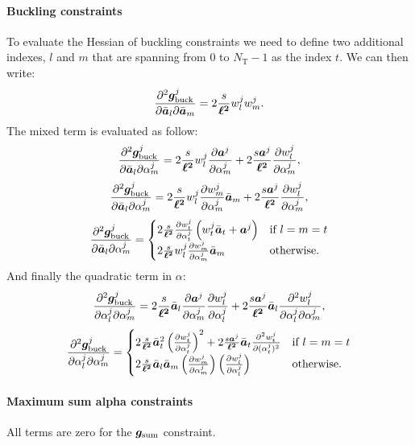 \paragraph*{Buckling constraints}
To evaluate the Hessian of buckling constraints we need to define two additional indexes, $l$ and $m$ that are spanning from 0 to $N_\text{T}-1$ as the index $t$. We can then write:
\begin{equation}
    \frac{\partial^2\bm{g}_\text{buck}^j}{\partial\bar{\bm{a}}_l\partial\bar{\bm{a}}_m} = 2\frac{s}{\bm{\ell^2}} w_l^j w_m^j.
\end{equation}
The mixed term is evaluated as follow:
\begin{equation}
    \frac{\partial^2\bm{g}_\text{buck}^j}{\partial{\bar{\bm{a}}_l}\partial\alpha_m^j} =  2\frac{s}{\bm{\ell^2}} w_l^j \frac{\partial\bm{a}^j}{\partial\alpha^j_m} + 2\frac{s\bm{a}^j}{\bm{\ell^2}} \frac{\partial w_l^j}{\partial\alpha_m^j},
\end{equation}
\begin{equation}
    \frac{\partial^2\bm{g}_\text{buck}^j}{\partial{\bar{\bm{a}}_l}\partial\alpha_m^j} = 2\frac{s}{\bm{\ell^2}}w_l^j \frac{\partial w_m^j}{\partial\alpha_m^j}  \bar{\bm{a}}_m + 2\frac{s\bm{a}^j}{\bm{\ell^2}} \frac{\partial w_l^j}{\partial\alpha_m^j},
\end{equation}
\begin{equation}
    \frac{\partial^2\bm{g}_\text{buck}^j}{\partial{\bar{\bm{a}}_l}\partial\alpha_m^j}=
    \begin{cases}
         2\frac{s}{\bm{\ell^2}} \frac{\partial w_t^j}{\partial\alpha_t^j}\left( w_t^j \bar{\bm{a}}_t + \bm{a}^j \right) & \text{if }l=m=t \\
         2\frac{s}{\bm{\ell^2}}w_l^j \frac{\partial w_m^j}{\partial\alpha_m^j}  \bar{\bm{a}}_m & \text{otherwise.}
        
    \end{cases}
\end{equation}
And finally the quadratic term in $\alpha$:
\begin{equation}
    \frac{\partial^2\bm{g}_\text{buck}^j}{\partial\alpha^j_l\partial\alpha^j_m} =  2\frac{s}{\bm{\ell^2}}\bar{\bm{a}}_l \frac{\partial\bm{a}^j}{\partial\alpha^j_m} \frac{\partial w_l^j}{\partial\alpha^j_l} + 2\frac{s\bm{a}^j}{\bm{\ell^2}}\bar{\bm{a}}_l \frac{\partial^2w_l^j}{\partial\alpha^j_l\partial\alpha^j_m},
\end{equation}
\begin{equation}
    \frac{\partial^2\bm{g}_\text{buck}^j}{\partial\alpha^j_l\partial\alpha^j_m} = 
    \begin{cases}
        2\frac{s}{\bm{\ell^2}}\bar{\bm{a}}_t^2\left(\frac{\partial w_t^j}{\partial\alpha_t^j}\right)^2  + 2\frac{s\bm{a}^j}{\bm{\ell^2}}\bar{\bm{a}}_t \frac{\partial^2w_t^j}{\partial(\alpha^j_t)^2} & \text{if }l=m=t\\
        2\frac{s}{\bm{\ell^2}}\bar{\bm{a}}_l\bar{\bm{a}}_m\left(\frac{\partial w_m^j}{\partial\alpha_m^j}\right) \left(\frac{\partial w_l^j}{\partial\alpha_l^j}\right)
         & \text{otherwise.}
    \end{cases}
\end{equation}
\paragraph*{Maximum sum alpha constraints}
All terms are zero for the $\bm{g}_\text{sum}$ constraint.